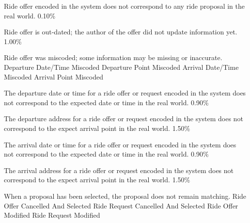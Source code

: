   \startkaosspec
  	 {Ride offer encoded in the system does not correspond to any ride proposal in the real world.}
  	 {0.10\%}
  \stopkaosspec

  \startkaosspec
  	 {Ride offer is out-dated; the author of the offer did not update information yet.}
  	 {1.00\%}
  \stopkaosspec

  \startkaosspec
  	 {Ride offer was miscoded; some information may be missing or inaccurate.}
  	 {Departure Date/Time Miscoded}
  	 {Departure Point Miscoded}
  	 {Arrival Date/Time Miscoded}
  	 {Arrival Point Miscoded}
  \stopkaosspec

  \startkaosspec
  	 {The departure date or time for a ride offer or request encoded in the system does not correspond to the expected date or time in the real world.}
  	 {0.90\%}
  \stopkaosspec

  \startkaosspec
  	 {The departure address for a ride offer or request encoded in the system does not correspond to the expect arrival point in the real world.}
  	 {1.50\%}
  \stopkaosspec

  \startkaosspec
  	 {The arrival date or time for a ride offer or request encoded in the system does not correspond to the expected date or time in the real world.}
  	 {0.90\%}
  \stopkaosspec

  \startkaosspec
  	 {The arrival address for a ride offer or request encoded in the system does not correspond to the expect arrival point in the real world.}
  	 {1.50\%}
  \stopkaosspec
    

    {}
    
  \startkaosspec
     {When a proposal has been selected, the proposal does not remain matching.}
     {Ride Offer Cancelled And Selected}
     {Ride Request Cancelled And Selected}
     {Ride Offer Modified}
     {Ride Request Modified}
  \stopkaosspec

